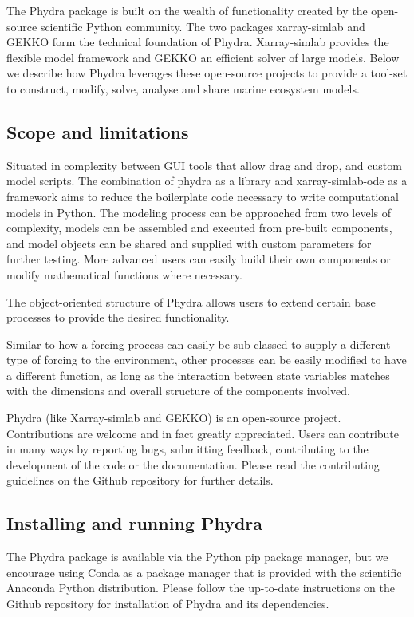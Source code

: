 \documentclass[journal abbreviation, manuscript]{copernicus}
\begin{document}
The Phydra package is built on the wealth of functionality created by the open-source scientific Python community. The two packages xarray-simlab and GEKKO form the technical foundation of Phydra. Xarray-simlab provides the flexible model framework and GEKKO an efficient solver of large models. Below we describe how Phydra leverages these open-source projects to provide a tool-set to construct, modify, solve, analyse and share marine ecosystem models. 

\subsection{Scope and limitations}

Situated in complexity between GUI tools that allow drag and drop, and custom model scripts. The combination of phydra as a library and xarray-simlab-ode as a framework aims to reduce the boilerplate code necessary to write computational models in Python.
The modeling process can be approached from two levels of complexity, models can be assembled and executed from pre-built components, and model objects can be shared and supplied with custom parameters for further testing. More advanced users can easily build their own components or modify mathematical functions where necessary.

The object-oriented structure of Phydra allows users to extend certain base processes to provide the desired functionality. 

Similar to how a forcing process can easily be sub-classed to supply a different type of forcing to the environment, other processes can be easily modified to have a different function, as long as the interaction between state variables matches with the dimensions and overall structure of the components involved. 

Phydra (like Xarray-simlab and GEKKO) is an open-source project. Contributions are welcome and in fact greatly appreciated. Users can contribute in many ways by reporting bugs, submitting feedback, contributing to the development of the code or the documentation. Please read the contributing guidelines on the Github repository for further details.

\subsection{Installing and running Phydra}
The Phydra package is available via the Python pip package manager, but we encourage using Conda as a package manager that is provided with the scientific Anaconda Python distribution.
Please follow the up-to-date instructions on the Github repository for installation of Phydra and its dependencies.
\end{document}
